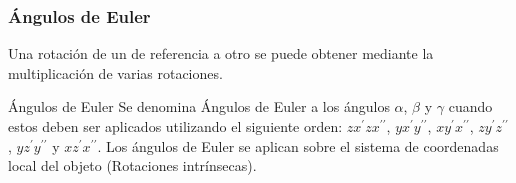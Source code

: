 \begin{frame}
    \frametitle{Ángulos de Euler}
    \scriptsize


    
    Una rotación de un de referencia a otro se puede obtener mediante la multiplicación de varias rotaciones.
    
    \begin{block}{Ángulos de Euler}
        Se denomina Ángulos de Euler a los ángulos $\alpha$, $\beta$ y $\gamma$ cuando estos deben ser aplicados utilizando el siguiente orden: $zx^{\prime}zx^{\prime\prime}$, $yx^{\prime}y^{\prime\prime}$, $xy^{\prime}x^{\prime\prime}$, $zy^{\prime}z^{\prime\prime}$, $yz^{\prime}y^{\prime\prime}$ y $xz^{\prime}x^{\prime\prime}$. Los ángulos de Euler se aplican sobre el sistema de coordenadas local del objeto (Rotaciones intrínsecas).
    \end{block}
   

\end{frame}
